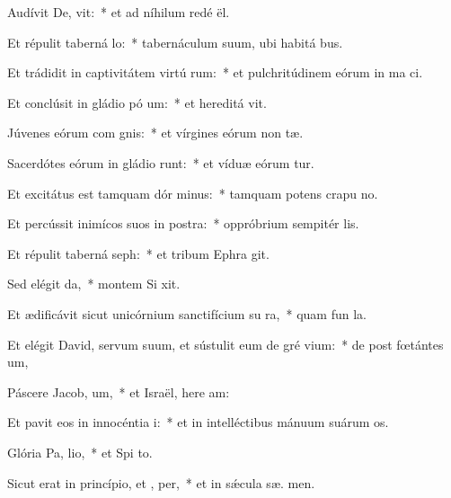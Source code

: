 \item Audívit De,  vit:~* et ad níhilum redé  ël.
\item Et répulit taberná lo:~* tabernáculum suum, ubi habitá  bus.
\item Et trádidit in captivitátem virtú rum:~* et pulchritúdinem eórum in ma ci.
\item Et conclúsit in gládio pó um:~* et hereditá  vit.
\item Júvenes eórum com gnis:~* et vírgines eórum non  tæ.
\item Sacerdótes eórum in gládio runt:~* et víduæ eórum  tur.
\item Et excitátus est tamquam dór minus:~* tamquam potens crapu  no.
\item Et percússit inimícos suos in postra:~* oppróbrium sempitér  lis.
\item Et répulit taberná seph:~* et tribum Ephra  git.
\item Sed elégit  da,~* montem Si  xit.
\item Et ædificávit sicut unicórnium sanctifícium su  ra,~* quam fun  la.
\item Et elégit David, servum suum, et sústulit eum de gré vium:~* de post fœtántes  um,
\item Páscere Jacob,  um,~* et Israël, here am:
\item Et pavit eos in innocéntia  i:~* et in intelléctibus mánuum suárum  os.
\item Glória Pa,  lio,~* et Spi to.
\item Sicut erat in princípio, et ,  per,~* et in sǽcula sæ. men.
